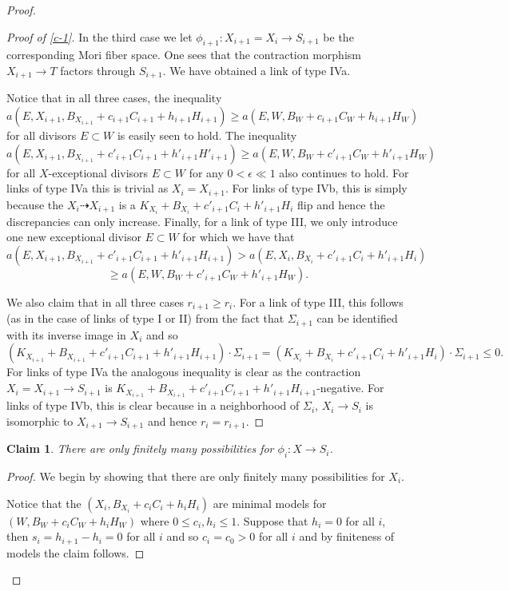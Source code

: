 \documentclass[12pt]{amsart}
\theoremstyle{plain}
\newtheorem{claim}[theorem]{Claim}
\begin{document}
\begin{proof}
\begin{proof}[Proof of \ref{c-1}]
In the third case we let $\phi _{i+1}:X_{i+1}=X_i\to S_{i+1}$ be the 
corresponding Mori fiber space. One sees that the
contraction morphism $X_{i+1}\to T$ factors through $S_{i+1}$.
We have obtained a link of type IVa.

Notice that in all three cases, the inequality
$$a(E,X_{i+1},B_{X_{i+1}}+c_{i+1}C_{i+1}+h_{i+1}H_{i+1})\geq 
a(E,W,B_W+c_{i+1}C_W+h_{i+1}H_W)$$ for all 
divisors $E\subset W$ is easily seen to hold.
The inequality
$$a(E,X_{i+1},B_{X_{i+1}}+c'_{i+1}C_{i+1}+h'_{i+1}H'_{i+1})\geq  
a(E,W,B_W+c'_{i+1}C_W+h'_{i+1}H_W)$$ for all 
$X$-exceptional divisors $E\subset W$ 
for any $0<\epsilon \ll 1$
also continues to hold. For links of type IVa this is trivial as $X_i=X_{i+1}$.
For links of type IVb, this is simply because the $X_i\dasharrow X_{i+1}$
is a $K_ {X_{i}}+B_{X_{i}}+c'_{i+1}C_{i}+h'_{i+1}H_{i}$ flip and hence the 
discrepancies can only increase.
Finally, for a link of type III, we only introduce one
new exceptional divisor $E\subset W$ for which we have that
$$a(E,X_{i+1},B_{X_{i+1}}+c'_{i+1}C_{i+1}+h'_{i+1}H_{i+1})>a(E,X_{i},B_{X_{i}}+c'_{i+1}C_{i}+h'_{i+1}H_{i}) $$
$$\geq a(E,W,B_W+c'_{i+1}C_W+h'_{i+1}H_W) .$$ 

We also claim that in all three cases $r_{i+1}\geq r_i$.
For a link of type III, this follows (as in the case of links of type I or II)
from the fact that $\Sigma _{i+1}$ can be identified with its inverse image in $X_i$ and so 
$$(K_{X_{i+1}}+B_{X_{i+1}}+c'_{i+1}C_{i+1}+h'_{i+1}H_{i+1})\cdot \Sigma _{i+1}
=(K_{X_{i}}+B_{X_{i}}+c'_{i+1}C_{i}+h'_{i+1}H_{i})\cdot \Sigma _{i+1}\leq 0.$$
For links of type IVa the analogous inequality is clear as the 
contraction $X_{i}=X_{i+1}\to S_{i+1}$ is $K_{X_{i+1}}+B_{X_{i+1}}+c'_{i+1}C_{i+1}+h'_{i+1}H_{i+1}$-negative.
For links of type IVb, this is clear because in a neighborhood of $\Sigma _i$,
$X_{i}\to S_{i}$ is isomorphic to $X_{i+1}\to S_{i+1}$ and hence $r_i=r_{i+1}$.
\end{proof}
\begin{claim}\label{c-3}There are only finitely many possibilities for $\phi _i:X\to S_i$.\end{claim}
\begin{proof} We begin by showing that there are only finitely many possibilities for $X_i$.

Notice that the $(X_i,B_{X_i}+c_iC_i+h_iH_i)$ are minimal models for
$(W,B_W+c_iC_W+h_iH_W)$ where $0\leq c_i,h_i \leq 1$.
Suppose that $h_i=0$ for all $i$, then $s_i=h_{i+1}-h_i=0$ for all $i$
and so $c_i=c_0>0$ for all $i$ and by finiteness of models the claim follows.
 

\end{proof}
\end{proof}
\end{document}

